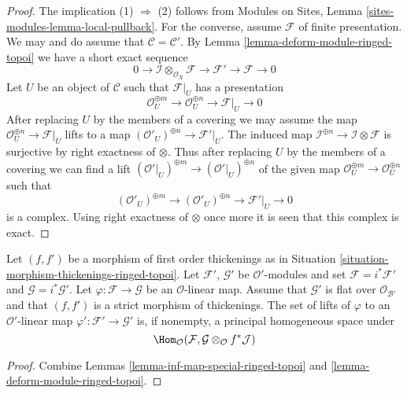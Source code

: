 \begin{proof}
The implication (1) $\Rightarrow$ (2) follows from
Modules on Sites, Lemma \ref{sites-modules-lemma-local-pullback}.
For the converse, assume $\mathcal{F}$ of finite presentation.
We may and do assume that $\mathcal{C} = \mathcal{C}'$.
By Lemma \ref{lemma-deform-module-ringed-topoi} we have a short exact sequence
$$
0 \to \mathcal{I} \otimes_{\mathcal{O}_X} \mathcal{F} \to
\mathcal{F}' \to \mathcal{F} \to 0
$$
Let $U$ be an object of $\mathcal{C}$ such that $\mathcal{F}|_U$ has a
presentation
$$
\mathcal{O}_U^{\oplus m} \to \mathcal{O}_U^{\oplus n} \to \mathcal{F}|_U \to 0
$$
After replacing $U$ by the members of a covering we may assume the
map $\mathcal{O}_U^{\oplus n} \to \mathcal{F}|_U$ lifts to a map
$(\mathcal{O}'_U)^{\oplus n} \to \mathcal{F}'|_U$. The induced map
$\mathcal{I}^{\oplus n} \to \mathcal{I} \otimes \mathcal{F}$ is
surjective by right exactness of $\otimes$. Thus after replacing $U$
by the members of a covering we can find a lift
$(\mathcal{O}'|_U)^{\oplus m} \to (\mathcal{O}'|_U)^{\oplus n}$
of the given map $\mathcal{O}_U^{\oplus m} \to \mathcal{O}_U^{\oplus n}$
such that
$$
(\mathcal{O}'_U)^{\oplus m} \to (\mathcal{O}'_U)^{\oplus n} \to
\mathcal{F}'|_U \to 0
$$
is a complex. Using right exactness of $\otimes$ once more it is seen
that this complex is exact.
\end{proof}

\begin{lemma}
\label{lemma-inf-map-rel-ringed-topoi}
Let $(f, f')$ be a morphism of first order thickenings as in
Situation \ref{situation-morphism-thickenings-ringed-topoi}.
Let $\mathcal{F}'$, $\mathcal{G}'$ be $\mathcal{O}'$-modules and set
$\mathcal{F} = i^*\mathcal{F}'$ and $\mathcal{G} = i^*\mathcal{G}'$.
Let $\varphi : \mathcal{F} \to \mathcal{G}$ be an $\mathcal{O}$-linear map.
Assume that $\mathcal{G}'$ is flat over $\mathcal{O}_{\mathcal{B}'}$ and that
$(f, f')$ is a strict morphism of thickenings.
The set of lifts of $\varphi$ to an $\mathcal{O}'$-linear map
$\varphi' : \mathcal{F}' \to \mathcal{G}'$ is, if nonempty, a principal
homogeneous space under
$$
\Hom_\mathcal{O}(\mathcal{F},
\mathcal{G} \otimes_\mathcal{O} f^*\mathcal{J})
$$
\end{lemma}

\begin{proof}
Combine Lemmas \ref{lemma-inf-map-special-ringed-topoi} and
\ref{lemma-deform-module-ringed-topoi}.
\end{proof}

